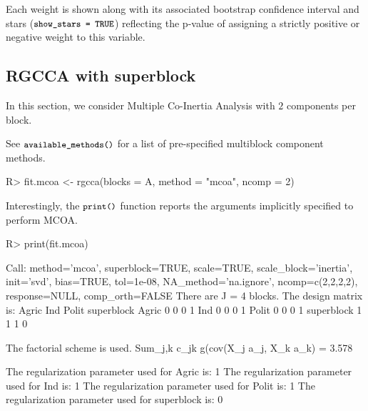 \documentclass[
]{jss}
\begin{document}
\normalsize

Each weight is shown along with its associated bootstrap confidence
interval and stars (\(\small{\texttt{show\_stars = TRUE}}\)) reflecting
the p-value of assigning a strictly positive or negative weight to this
variable.

\hypertarget{rgcca-with-superblock}{%
\subsection{RGCCA with superblock}\label{rgcca-with-superblock}}

In this section, we consider Multiple Co-Inertia Analysis
\citep{Chessel1996} \citep[MCOA, also called MCIA in][]{Cantini2021}
with \(2\) components per block.

See \(\small{\texttt{available\_methods()}}\) for a list of
pre-specified multiblock component methods.

\footnotesize

\begin{CodeChunk}
\begin{CodeInput}
R> fit.mcoa <- rgcca(blocks = A, method = "mcoa", ncomp = 2)
\end{CodeInput}
\end{CodeChunk}

\normalsize

Interestingly, the \(\small{\texttt{print()}}\) function reports the
arguments implicitly specified to perform MCOA.

\footnotesize

\begin{CodeChunk}
\begin{CodeInput}
R> print(fit.mcoa)
\end{CodeInput}
\begin{CodeOutput}
Call: method='mcoa', superblock=TRUE, scale=TRUE, scale_block='inertia', init='svd',
bias=TRUE, tol=1e-08, NA_method='na.ignore', ncomp=c(2,2,2,2), response=NULL,
comp_orth=FALSE 
There are J = 4 blocks.
The design matrix is:
           Agric Ind Polit superblock
Agric          0   0     0          1
Ind            0   0     0          1
Polit          0   0     0          1
superblock     1   1     1          0

The factorial scheme is used.
Sum_{j,k} c_jk g(cov(X_j a_j, X_k a_k) = 3.578 

The regularization parameter used for Agric is: 1
The regularization parameter used for Ind is: 1
The regularization parameter used for Polit is: 1
The regularization parameter used for superblock is: 0
\end{CodeOutput}
\end{CodeChunk}
\end{document}
